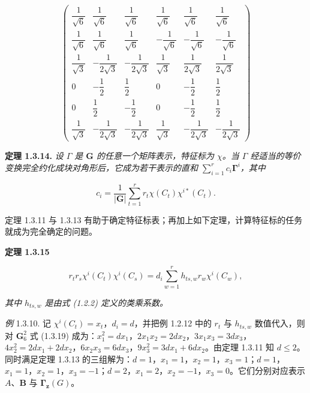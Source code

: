\begin{equation*}
\left( \begin{array}{cccccc}
\dfrac{1}{\sqrt{6}} & \dfrac{1}{\sqrt{6}} & \dfrac{1}{\sqrt{6}} & \dfrac{1}{\sqrt{6}} & \dfrac{1}{\sqrt{6}} & \dfrac{1}{\sqrt{6}} \\[2mm]
\dfrac{1}{\sqrt{6}} & \dfrac{1}{\sqrt{6}} & \dfrac{1}{\sqrt{6}} & -\dfrac{1}{\sqrt{6}} & -\dfrac{1}{\sqrt{6}} & -\dfrac{1}{\sqrt{6}} \\[2mm]
\dfrac{1}{\sqrt{3}} & -\dfrac{1}{2\sqrt{3}} & -\dfrac{1}{2\sqrt{3}} & \dfrac{1}{\sqrt{3}} & \dfrac{1}{2\sqrt{3}} & \dfrac{1}{2\sqrt{3}} \\[2mm]
0 & -\dfrac{1}{2} & \dfrac{1}{2} & 0 & -\dfrac{1}{2} & \dfrac{1}{2} \\[2mm]
0 & \dfrac{1}{2} & -\dfrac{1}{2} & 0 & -\dfrac{1}{2} & \dfrac{1}{2} \\[2mm]
\dfrac{1}{\sqrt{3}} & -\dfrac{1}{2\sqrt{3}} & -\dfrac{1}{2\sqrt{3}} & \dfrac{1}{\sqrt{3}} & -\dfrac{1}{2\sqrt{3}} & -\dfrac{1}{2\sqrt{3}}
\end{array} \right)
\end{equation*}

\textbf{定理 1.3.14.} \textit{设 $\Gamma$ 是 $\mathbf{G}$ 的任意一个矩阵表示，特征标为 $\chi$。当 $\Gamma$ 经适当的等价变换完全约化成块对角形后，它成为若干表示的直和 $\sum_{i=1}^{r} c_{i}\mathbf{\Gamma}^{i}$，其中}

\begin{equation*}
c_{i} = \frac{1}{|\mathbf{G}|}\sum_{t=1}^{r} r_{t}\chi(C_{t})\chi^{i*}(C_{t}).
\tag{1.3.18}
\end{equation*}

定理 1.3.11 与 1.3.13 有助于确定特征标表；再加上如下定理，计算特征标的任务就成为完全确定的问题。

\textbf{定理 1.3.15}

\begin{equation*}
r_{t}r_{s}\chi^{i}(C_{t})\chi^{i}(C_{s}) = d_{i}\sum_{w=1}^{r} h_{ts,w}r_{w}\chi^{i}(C_{w}),
\tag{1.3.19}
\end{equation*}

\textit{其中 $h_{ts,w}$ 是由式 (1.2.2) 定义的类乘系数。}

\textit{例} 1.3.10. 记 $\chi^{i}(C_{t}) = x_{t}$，$d_{i} = d$，并把例 1.2.12 中的 $r_{t}$ 与 $h_{ts,w}$ 数值代入，则对 $\mathbf{G}_6^2$ 式 (1.3.19) 成为：$x_{1}^{2} = dx_{1}$，$2x_{1}x_{2} = 2dx_{2}$，$3x_{1}x_{3} = 3dx_{3}$，$4x_{2}^{2} = 2dx_{1} + 2dx_{2}$，$6x_{2}x_{3} = 6dx_{3}$，$9x_{3}^{2} = 3dx_{1} + 6dx_{2}$。由定理 1.3.11 知 $d \leqslant 2$。同时满足定理 1.3.13 的三组解为：$d = 1$，$x_{1} = 1$，$x_{2} = 1$，$x_{3} = 1$；$d = 1$，$x_{1} = 1$，$x_{2} = 1$，$x_{3} = -1$；$d = 2$，$x_{1} = 2$，$x_{2} = -1$，$x_{3} = 0$。它们分别对应表示 $A$、$\mathbf{B}$ 与 $\mathbf{\Gamma}_{\mathbf{z}}(G)$。

